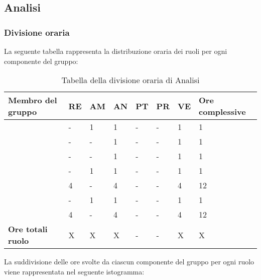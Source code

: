 \subsection{Analisi}

\subsubsection{Divisione oraria}
La seguente tabella rappresenta la distribuzione oraria dei ruoli per ogni componente del gruppo:
{

\renewcommand{\arraystretch}{2}
\begin{longtable}[h!] { C{4cm} C{1cm} C{1cm} C{1cm} C{1cm} C{1cm} C{1cm} C{3cm}}
\caption{Tabella della divisione oraria di Analisi}	\\
\rowcolor{\primaryColor}

\textcolor{\secondaryColor}{\textbf{Membro del gruppo}} & 
\textcolor{\secondaryColor}{\textbf{RE}} & 
\textcolor{\secondaryColor}{\textbf{AM}} & 
\textcolor{\secondaryColor}{\textbf{AN}} & 
\textcolor{\secondaryColor}{\textbf{PT}} & 
\textcolor{\secondaryColor}{\textbf{PR}} & 
\textcolor{\secondaryColor}{\textbf{VE}} & 
\textcolor{\secondaryColor}{\textbf{Ore complessive}}\\	
\endhead

\AD{}                     &  - &  1 &  1 & - & - & 1 & 1 \\
\AT{}                     &  - &  - &  1 & - & - & 1 & 1 \\
\AW{}                     &  - &  - &  1 & - & - & 1 & 1 \\
\EC{}                     &  - &  1 &  1 & - & - & 1 & 1 \\
\EM{}                     &  4 &  - &  4 & - & - & 4 & 12 \\
\FP{}                     &  - &  1 &  1 & - & - & 1 & 1 \\
\GG{}                     &  4 &  - &  4 & - & - & 4 & 12 \\
\textbf{Ore totali ruolo} & X & X & X & - & - & X & X \\

\end{longtable}
}
La suddivisione delle ore svolte da ciascun componente del gruppo per ogni ruolo viene rappresentata nel seguente istogramma:
